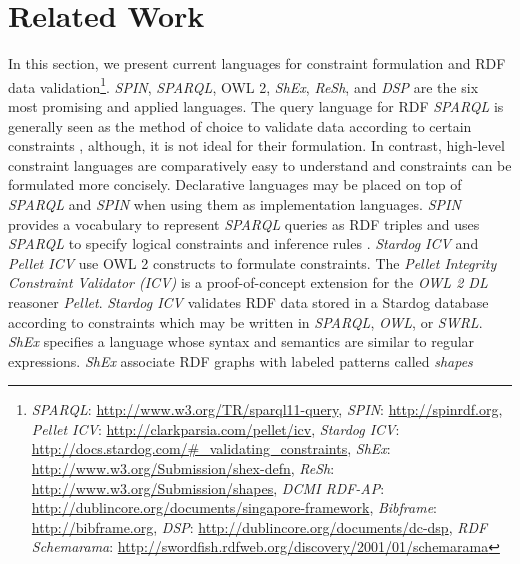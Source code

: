 \documentclass[a4paper,fontsize=11pt]{scrartcl}
\begin{document}

\section{Related Work}

In this section, we present current languages for constraint formulation and RDF data validation\footnote{
\emph{SPARQL}: \url{http://www.w3.org/TR/sparql11-query}, 
\emph{SPIN}: \url{http://spinrdf.org},
\emph{Pellet ICV}: \url{http://clarkparsia.com/pellet/icv},
\emph{Stardog ICV}: \url{http://docs.stardog.com/#_validating_constraints},
\emph{ShEx}: \url{http://www.w3.org/Submission/shex-defn},
\emph{ReSh}: \url{http://www.w3.org/Submission/shapes},
\emph{DCMI RDF-AP}: \url{http://dublincore.org/documents/singapore-framework},
\emph{Bibframe}: \url{http://bibframe.org},
\emph{DSP}: \url{http://dublincore.org/documents/dc-dsp},
\emph{RDF Schemarama}: \url{http://swordfish.rdfweb.org/discovery/2001/01/schemarama}
}.
\emph{SPIN}, \emph{SPARQL}, OWL 2, \emph{ShEx}, \emph{ReSh}, and \emph{DSP} are the six most promising and applied languages.
%
The query language for RDF \emph{SPARQL} is generally seen as the method of choice to validate data according to certain constraints \cite{Fuerber2010}, 
although, it is not ideal for their formulation. 
In contrast, high-level constraint languages are comparatively easy to understand and constraints can be formulated more concisely.
Declarative languages may be placed on top of \emph{SPARQL} and \emph{SPIN} when using them as implementation languages.
%
\emph{SPIN} provides a vocabulary to represent \emph{SPARQL} queries as RDF triples
and uses \emph{SPARQL} to specify logical constraints and inference rules \cite{Fuerber2010}.
%
\emph{Stardog ICV} and \emph{Pellet ICV} use OWL 2 constructs to formulate constraints.
The \emph{Pellet Integrity Constraint Validator (ICV)} is a proof-of-concept extension for the \emph{OWL 2 DL} reasoner \emph{Pellet}. 
\emph{Stardog ICV} 
validates RDF data stored in a Stardog database according to 
constraints which may be written in \emph{SPARQL}, \emph{OWL}, or \emph{SWRL}. 
%
\emph{ShEx} specifies a language whose syntax and semantics are similar to regular expressions.
\emph{ShEx} associate RDF graphs with labeled patterns called \emph{shapes} 
\end{document}
